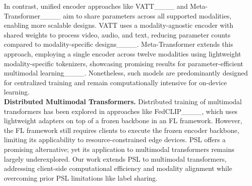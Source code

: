 In contrast, unified encoder approaches like VATT____ and Meta-Transformer____ aim to share parameters across all supported modalities, enabling more scalable designs. VATT uses a modality-agnostic encoder with shared weights to process video, audio, and text, reducing parameter counts compared to modality-specific designs____. Meta-Transformer extends this approach, employing a single encoder across twelve modalities using lightweight modality-specific tokenizers, showcasing promising results for parameter-efficient multimodal learning____. Nonetheless, such models are predominantly designed for centralized training and remain computationally intensive for on-device learning. \\

\noindent \textbf{Distributed Multimodal Transformers.} Distributed training of multimodal transformers has been explored in approaches like FedCLIP____, which uses lightweight adapters on top of a frozen backbone in an FL framework. However, the FL framework still requires clients to execute the frozen encoder backbone, limiting its applicability to resource-constrained edge devices. PSL offers a promising alternative; yet its application to multimodal transformers remains largely underexplored.
Our work extends PSL to multimodal transformers, addressing client-side computational efficiency and modality alignment while overcoming prior PSL limitations like label sharing.